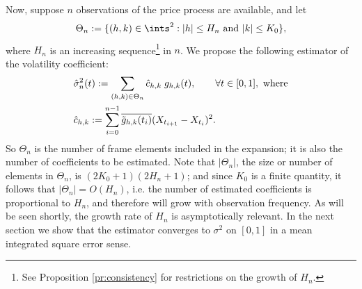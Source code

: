  Now, suppose $n$ observations of the price process are available, and let 
\begin{align}
  \Theta_n := \{(h,k) \in \ints^2 : |h| \le H_n \text{ and }|k| \le K_0\},
  \label{eq:theta}
\end{align}
where $H_n$ is an increasing sequence\footnote{See Proposition \eqref{pr:consistency} for restrictions on the growth of $H_n$.} in $n$.    
We propose the following estimator of the volatility coefficient:
\begin{align}
  &\hat{\sigma}_{n}^2(t) := \sum_{(h,k) \in \Theta_n} \hat{c}_{h,k}\;g_{h,k}(t), \qquad \forall t \in [0,1], \text{ where}\\
  &\hat{c}_{h,k} := \sum_{i =0}^{n-1} \overline{\tilde{g}_{h,k}(t_i)} (X_{t_{i+1}} - X_{t_i})^2.
  \label{eq:contvolestimator}
\end{align}
So $\Theta_n$ is the number of frame elements included in the expansion; it is also the number of coefficients to be estimated.  Note that $\vert \Theta_n\vert$, the size or number of elements in $\Theta_n$,  is $(2K_0 + 1)(2H_n+1)$; and since $K_0$ is a finite quantity, it follows that $\vert\Theta_n\vert = O(H_n)$, i.e. the number of estimated coefficients is proportional to $H_n$, and therefore will grow with observation frequency. As will be seen shortly, the growth rate of $H_n$ is asymptotically relevant.
In the next section we show that the estimator converges to $\sigma^2$ on $[0,1]$ in a mean integrated square error sense.

